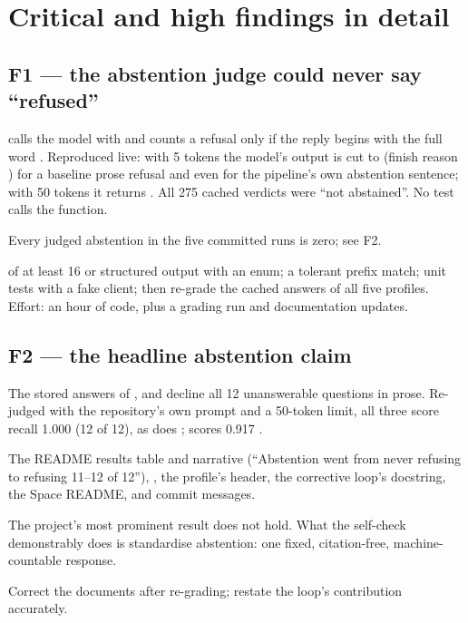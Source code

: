 \section{Critical and high findings in detail}

\subsection*{F1 --- the abstention judge could never say \enquote{refused}}

\begin{description}[style=nextline]
  \item[Evidence]  calls the model with  and counts a refusal only if the reply begins with the full word  . Reproduced live: with 5 tokens the model's output is cut to  (finish reason ) for a baseline prose refusal and even for the pipeline's own abstention sentence; with 50 tokens it returns . All 275 cached verdicts were \enquote{not abstained}. No test calls the function.
  \item[Impact] Every judged abstention in the five committed runs is zero; see F2.
  \item[Fix]  of at least 16 or structured output with an enum; a tolerant prefix match; unit tests with a fake client; then re-grade the cached answers of all five profiles. Effort: an hour of code, plus a grading run and documentation updates.
\end{description}

\subsection*{F2 --- the headline abstention claim}

\begin{description}[style=nextline]
  \item[Evidence] The stored answers of ,  and  decline all 12 unanswerable questions in prose. Re-judged with the repository's own prompt and a 50-token limit, all three score recall 1.000 (12 of 12), as does ;  scores 0.917 \tagM.
  \item[Where the claim appears] The README results table and narrative (\enquote{Abstention went from never refusing to refusing 11--12 of 12}), , the  profile's header, the corrective loop's docstring, the Space README, and commit messages.
  \item[Impact] The project's most prominent result does not hold. What the self-check demonstrably does is standardise abstention: one fixed, citation-free, machine-countable response.
  \item[Fix] Correct the documents after re-grading; restate the loop's contribution accurately.
\end{description}

